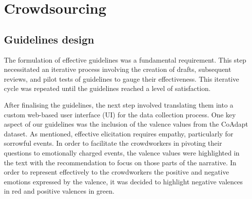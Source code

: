 
\section{Crowdsourcing}
\subsection{Guidelines design}
The formulation of effective guidelines was a fundamental requirement. This step necessitated an iterative process involving the creation of drafts, subsequent reviews, and pilot tests of guidelines to gauge their effectiveness. This iterative cycle was repeated until the guidelines reached a level of satisfaction.

After finalising the guidelines, the next step involved translating them into a custom web-based user interface (UI) for the data collection process. One key aspect of our guidelines was the inclusion of the valence values from the CoAdapt dataset. 
As mentioned, effective elicitation requires empathy, particularly for sorrowful events. In order to facilitate the crowdworkers in pivoting their questions to emotionally charged events, the valence values were highlighted in the text with the recommendation to focus on those parts of the narrative. In order to represent effectively to the crowdworkers the positive and negative emotions expressed by the valence, it was decided to highlight negative valences in red and positive valences in green. 

